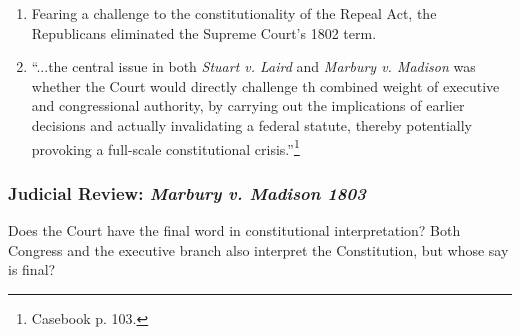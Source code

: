 \begin{enumerate}
\begin{enumerate}
        behavior'' clause presumably gave tenure for life.\footnote{U.S. 
        Const. art. III, \S\ 1.}
        \item Was it constitutional to assign Supreme Court justices to duty 
        on a lower court?
    \end{enumerate}
    \item Fearing a challenge to the constitutionality of the Repeal Act, the 
    Republicans eliminated the Supreme Court's 1802 term.
    \item ``...the central issue in both \emph{Stuart v. Laird} and 
    \emph{Marbury v. Madison} was whether the Court would directly challenge 
    th combined weight of executive and congressional authority, by carrying 
    out the implications of earlier decisions and actually invalidating a 
    federal statute, thereby potentially provoking a full-scale constitutional 
    crisis.''\footnote{Casebook p. 103.}
\end{enumerate}

\subsubsection{Judicial Review: \emph{Marbury v. Madison 1803}}

Does the Court have the final word in constitutional interpretation? Both 
Congress and the executive branch also interpret the Constitution, but whose 
say is final?

